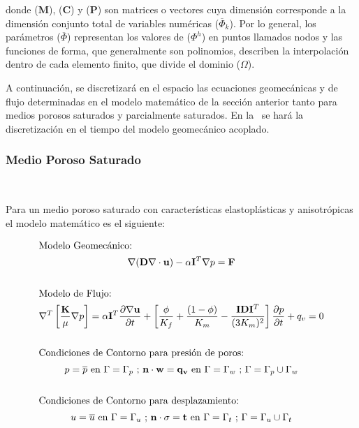 donde ($\mathbf{M}$), ($\mathbf{C}$) y ($\mathbf{P}$) son matrices o vectores cuya dimensión corresponde a la dimensión conjunto total de variables numéricas ($\overline{\Phi}_k$). Por lo general, los parámetros ($\overline{\Phi}$) representan los valores de ($\Phi^h$) en puntos llamados nodos y las funciones de forma, que generalmente son polinomios, describen la interpolación dentro de cada elemento finito, que divide el dominio ($\Omega$).\bigskip

A continuación, se discretizará en el espacio las ecuaciones geomecánicas y de flujo determinadas en el modelo matemático de la sección anterior tanto para medios porosos saturados y parcialmente saturados. En la~ se hará la discretización en el tiempo del modelo geomecánico acoplado.


\subsubsection{Medio Poroso Saturado}~\hypertarget{sec:sec3411}{}
\label{sec:sec3411}

Para un medio poroso saturado con características elastoplásticas y anisotrópicas el modelo matemático es el siguiente:

\begin{ceqn} 
\begin{subequations} \label{eq:equ345} 
\begin{gather}
\shortintertext{Modelo Geomecánico:} \mathbf{\nabla}(\mathbf{D}\mathbf{\nabla}\cdot\mathbf{u})-\alpha\mathbf{I}^T\mathbf{\nabla}p=\mathbf{F} \label{eq:equ345a} \\[15pt]
\shortintertext{Modelo de Flujo:} 	
\nabla^T \left[\frac{\mathbf{K}}{\mu}\nabla p\right] = \alpha\mathbf{I}^T\frac{\partial \nabla \mathbf{u}}{\partial t} +\left[\frac{\phi}{K_f}+\frac{(1-\phi)}{K_m}-\frac{\mathbf{I}\mathbf{D}\mathbf{I}^T}{(3K_{m})^{2}}\right]\frac{\partial p}{\partial t}+ q_v= 0 \label{eq:equ345b}\\[15pt]
\shortintertext{Condiciones de Contorno para presión de poros:} 	
p = \overline{p} \text{  en  } \Gamma = \Gamma_p \text{ ;  } \mathbf{n}\cdot\mathbf{w}=\mathbf{q_v} \text{  en  } \Gamma = \Gamma_w \text{ ; } \Gamma = \Gamma_p \cup \Gamma_w \label{eq:equ345c}\\[15pt]
\shortintertext{Condiciones de Contorno para desplazamiento:} 	
u = \overline{u} \text{  en  } \Gamma = \Gamma_u \text{ ;  } \mathbf{n}\cdot\mathbf{\sigma}=\mathbf{t} \text{  en  } \Gamma = \Gamma_t \text{ ; } \Gamma = \Gamma_u \cup \Gamma_t \label{eq:equ345d}
\end{gather}  
\end{subequations} 
\end{ceqn}

